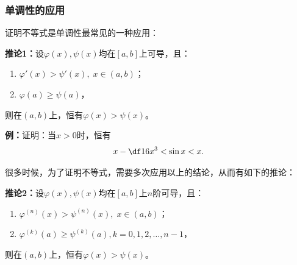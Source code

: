 \subsubsection{单调性的应用}

证明不等式是单调性最常见的一种应用：

\begin{thx}
	{\bf 推论1：}设$\varphi(x),\psi(x) $均在$[a,b]$上可导，且：
	\begin{enumerate}[(1)]
	  \item $\varphi'(x)>\psi'(x),\;x\in(a,b)$；
	  \item $\varphi(a)\geq\psi(a)$，
	\end{enumerate}
	则在$(a,b)$上，恒有$\varphi(x)>\psi(x)$。
\end{thx}

{\bf 例：}证明：当$x>0$时，恒有
$$x-\df 16x^3<\sin x<x.$$

\begin{center}
\end{center}

很多时候，为了证明不等式，需要多次应用以上的结论，从而有如下的推论：

\begin{thx}
	{\bf 推论2：}设$\varphi(x),\psi(x) $均在$[a,b]$上$n$阶可导，且：
	\begin{enumerate}[(1)]
	  \item $\varphi^{(n)}(x)>\psi^{(n)}(x),\;x\in(a,b)$；
	  \item $\varphi^{(k)}(a)\geq\psi^{(k)}(a),k=0,1,2,\ldots,n-1$，
	\end{enumerate}
	则在$(a,b)$上，恒有$\varphi(x)>\psi(x)$。
\end{thx}


